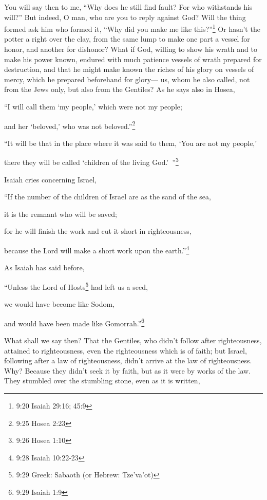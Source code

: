 \myverse{}You will say then to me, “Why does he still find fault? For who
withstands his will?”
\myverse{}But indeed, O man, who are you to reply against God? Will the thing formed
ask him who formed it, “Why did you make me like this?”\footnote{9:20 Isaiah 29:16;
	45:9}
\myverse{}Or hasn’t the potter a right over the clay, from the same lump to make one
part a vessel for honor, and another for dishonor?
\myverse{}What if God, willing to show his wrath and to make his power known, endured
with much patience vessels of wrath prepared for destruction,
\myverse{}and that he might make known the riches of his glory on vessels of mercy,
which he prepared beforehand for glory—
\myverse{}us, whom he also called, not from the Jews only, but also from the Gentiles?
\myverse{}As he says also in Hosea,

“I will call them ‘my people,’ which were not my people;

and her ‘beloved,’ who was not beloved.”\footnote{9:25 Hosea 2:23}

\myverse{}“It will be that in the place where it was said to them, ‘You
are not my people,’

there they will be called ‘children of the living God.’ ”\footnote{9:26 Hosea 1:10
}

\myverse{}Isaiah cries concerning Israel,

“If the number of the children of Israel are as the sand of the sea,

it is the remnant who will be saved;

\myverse{}for he will finish the work and cut it short in righteousness,

because the Lord will make a short work upon the earth.”\footnote{9:28 Isaiah 10:22-23}

\myverse{}As Isaiah has said before,

“Unless the Lord of Hosts\footnote{9:29 Greek: Sabaoth (or Hebrew: Tze’va’ot)
} had left us a seed,

we would have become like Sodom,

and would have been made like Gomorrah.”\footnote{9:29 Isaiah 1:9}

\myverse{}What shall we say then? That the Gentiles, who didn’t follow
after righteousness, attained to righteousness, even the righteousness which is of faith;
\myverse{}but Israel, following after a law of righteousness, didn’t arrive at the law
of righteousness.
\myverse{}Why? Because they didn’t seek it by faith, but as it were by works of the
law. They stumbled over the stumbling stone,
\myverse{}even as it is written,


